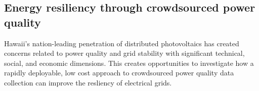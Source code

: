 
\subsection*{Energy resiliency through crowdsourced power quality}








Hawaii's nation-leading penetration of distributed photovoltaics has created concerns related to power quality and grid stability with significant technical, social, and economic dimensions. This creates opportunities to investigate how a rapidly deployable, low cost approach to crowdsourced power quality data collection can improve the resliency of electrical grids.

